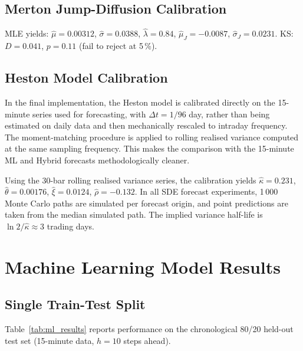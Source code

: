 \documentclass[12pt, a4paper, oneside]{report}
\theoremstyle{plain}
\theoremstyle{definition}
\theoremstyle{remark}
\begin{document}
\subsection{Merton Jump-Diffusion Calibration}

MLE yields:
$\hat\mu = 0.00312$, $\hat\sigma = 0.0388$, $\hat\lambda = 0.84$,
$\hat\mu_J = -0.0087$, $\hat\sigma_J = 0.0231$.
KS: $D = 0.041$, $p = 0.11$ (fail to reject at 5\,\%).

\subsection{Heston Model Calibration}

In the final implementation, the Heston model is calibrated directly on the
15-minute series used for forecasting, with $\Delta t = 1/96$ day, rather than
being estimated on daily data and then mechanically rescaled to intraday
frequency.  The moment-matching procedure is applied to rolling realised
variance computed at the same sampling frequency.  This makes the comparison
with the 15-minute ML and Hybrid forecasts methodologically cleaner.

Using the 30-bar rolling realised variance series, the calibration yields
$\hat\kappa = 0.231$, $\hat\theta = 0.00176$, $\hat\xi = 0.0124$,
$\hat\rho = -0.132$.  In all SDE forecast experiments, 1\,000 Monte Carlo
paths are simulated per forecast origin, and point predictions are taken from
the median simulated path.  The implied variance half-life is
$\ln 2 / \hat\kappa \approx 3$ trading days.

\section{Machine Learning Model Results}

\subsection{Single Train-Test Split}

Table~\ref{tab:ml_results} reports performance on the chronological 80/20
held-out test set (15-minute data, $h = 10$ steps ahead).
\end{document}
